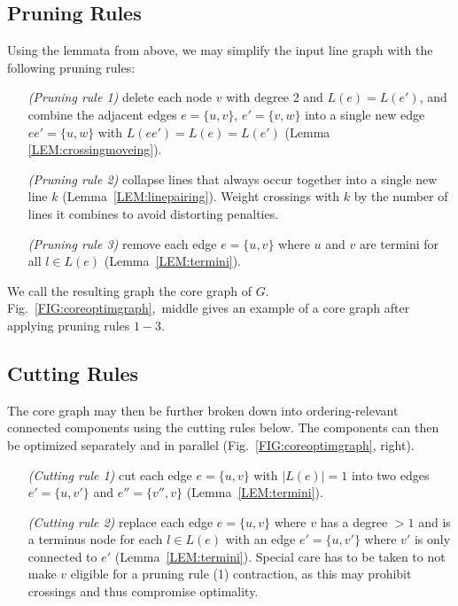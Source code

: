 \documentclass[format=acmsmall, review=false, screen=true]{acmart}
\begin{document}
\subsection{Pruning Rules}\label{SEC:pruning}

Using the lemmata from above, we may simplify the input line graph with the following pruning rules:
\begin{enumerate}[parsep=0.5mm, wide, labelwidth=0mm, itemindent=2.3mm]
	\setlength\itemsep{1pt}
	\item[\emph{(Pruning rule 1)}] delete each node $v$ with degree 2 and $L(e) = L(e')$, and combine the adjacent edges $e = \{u, v\}$, $e' = \{v, w\}$ into a single new edge $ee' = \{u, w\}$ with $L(ee') = L(e) = L(e')$ (Lemma \ref{LEM:crossingmoveing}).
	\item[\emph{(Pruning rule 2)}] collapse lines that always occur together into a single new line $k$ (Lemma~\ref{LEM:linepairing}). Weight crossings with $k$ by the number of lines it combines to avoid distorting penalties.
	\item[\emph{(Pruning rule 3)}] remove each edge $e = \{u, v\}$ where $u$ and $v$ are termini for all $l \in L(e)$ (Lemma~\ref{LEM:termini}).
\end{enumerate}
\noindent

We call the resulting graph the core graph of $G$. Fig.~\ref{FIG:coreoptimgraph},~middle gives an example of a core graph after applying pruning rules $1-3$.

\subsection{Cutting Rules}\label{SEC:cutting}

The core graph may then be further broken down into ordering-relevant connected components using the cutting rules below. The components can then be optimized separately and in parallel (Fig.~\ref{FIG:coreoptimgraph}, right).
\begin{enumerate}[parsep=0.5mm, wide, labelwidth=0mm, itemindent=2.3mm]
	\setlength\itemsep{1pt}
    \item[\emph{(Cutting rule 1)}] cut each edge $e = \{u, v\}$ with $\left|L\left(e\right)\right| = 1$ into two edges $e' = \{u, v'\}$ and $e'' = \{v'', v\}$ (Lemma~\ref{LEM:termini}).
    \item[\emph{(Cutting rule 2)}] replace each edge $e = \{u, v\}$ where $v$ has a degree $>1$ and is a terminus node for each $l \in L(e)$ with an edge $e' = \{u, v'\}$ where $v'$ is only connected to $e'$ (Lemma~\ref{LEM:termini}). Special care has to be taken to not make $v$ eligible for a pruning rule (1) contraction, as this may prohibit crossings and thus compromise optimality.
\end{enumerate}
\end{document}
